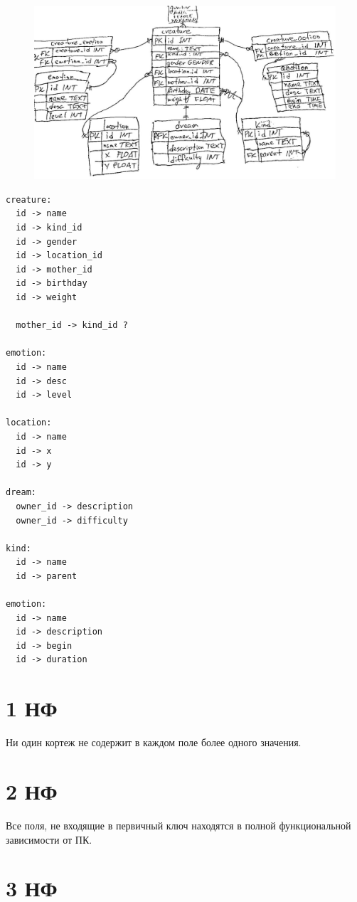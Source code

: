 \documentclass{article}
\begin{document}
\begin{figure}[th]
  \includegraphics[scale=0.2]{../lab-1/fig/er.jpg}
  \centering
\end{figure}

\begin{lstlisting}
creature:
  id -> name
  id -> kind_id
  id -> gender
  id -> location_id
  id -> mother_id
  id -> birthday
  id -> weight

  mother_id -> kind_id ?

emotion:
  id -> name
  id -> desc
  id -> level

location:
  id -> name
  id -> x
  id -> y

dream:
  owner_id -> description
  owner_id -> difficulty

kind:
  id -> name
  id -> parent

emotion:
  id -> name
  id -> description
  id -> begin
  id -> duration
\end{lstlisting}

\section{1 НФ}
Ни один кортеж не содержит в
каждом поле более одного
значения.

\section{2 НФ}

Все поля, не входящие в
первичный ключ находятся
в полной функциональной
зависимости от ПК.

\section{3 НФ}
\end{document}
